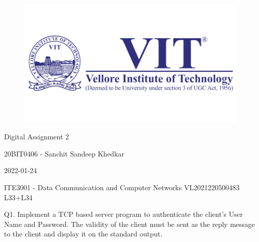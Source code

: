 \documentclass[12pt]{article}
\begin{document}
\begin{titlepage}
\NoBgThispage
   \begin{center}
        \begin{figure}[h] %
        \centering
        \includegraphics[width=15cm]{1583124354phpJTtnK5.png}
        \end{figure}

        \Huge{Digital Assignment 2}

        \vspace{0.5cm}
        \LARGE{20BIT0406 - Sanchit Sandeep Khedkar}
       
        \vspace{2.5 cm}
        \Large{2022-01-24}
        
        \vspace{0.25 cm}
        \Large{ITE3001 - Data Communication and Computer Networks}
        \large{VL2021220500483 L33+L34}
       

       \vfill
    \end{center}
\end{titlepage}
\newpage

\setcounter{page}{2}
\pagestyle{fancy}
\fancyhf{}
\rhead{\thepage}

Q1.  
Implement a TCP based server program to authenticate the client’s User Name and Password. The validity of the client must be sent as the reply message to the client and display it on the standard output.
\end{document}
